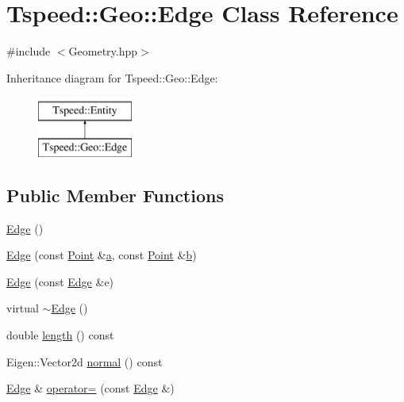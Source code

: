 \hypertarget{classTspeed_1_1Geo_1_1Edge}{\section{Tspeed\-:\-:Geo\-:\-:Edge Class Reference}
\label{classTspeed_1_1Geo_1_1Edge}
}


{\ttfamily \#include $<$Geometry.\-hpp$>$}

Inheritance diagram for Tspeed\-:\-:Geo\-:\-:Edge\-:\begin{figure}[H]
\begin{center}
\leavevmode
\includegraphics[height=2.000000cm]{classTspeed_1_1Geo_1_1Edge}
\end{center}
\end{figure}
\subsection*{Public Member Functions}
\begin{DoxyCompactItemize}
\item 
\hyperlink{classTspeed_1_1Geo_1_1Edge_aa28485aab77e5643067380c86c35e6b5}{Edge} ()
\item 
\hyperlink{classTspeed_1_1Geo_1_1Edge_aa0c751bf90737874583ef5dbf901f669}{Edge} (const \hyperlink{classTspeed_1_1Geo_1_1Point}{Point} \&\hyperlink{load__and__plot__lamb_8m_aa875ab3a8009406dcace7fa71a0f490d}{a}, const \hyperlink{classTspeed_1_1Geo_1_1Point}{Point} \&\hyperlink{load__and__plot__lamb_8m_a21c7e548e910bb7ce7dcea81de72c8f7}{b})
\item 
\hyperlink{classTspeed_1_1Geo_1_1Edge_a48bde3f5e50244cacc38226156aa124c}{Edge} (const \hyperlink{classTspeed_1_1Geo_1_1Edge}{Edge} \&e)
\item 
virtual \hyperlink{classTspeed_1_1Geo_1_1Edge_a76fa8e882724d339873d8ce89b827e89}{$\sim$\-Edge} ()
\item 
double \hyperlink{classTspeed_1_1Geo_1_1Edge_ac58cbabc588765cb501470fd0281a12e}{length} () const 
\item 
Eigen\-::\-Vector2d \hyperlink{classTspeed_1_1Geo_1_1Edge_af7c463f06cab88d0f4d15bb5adc3272c}{normal} () const 
\item 
\hyperlink{classTspeed_1_1Geo_1_1Edge}{Edge} \& \hyperlink{classTspeed_1_1Geo_1_1Edge_ad0d71349f5890f4e8abc62b44142b75b}{operator=} (const \hyperlink{classTspeed_1_1Geo_1_1Edge}{Edge} \&)
\end{DoxyCompactItemize}
